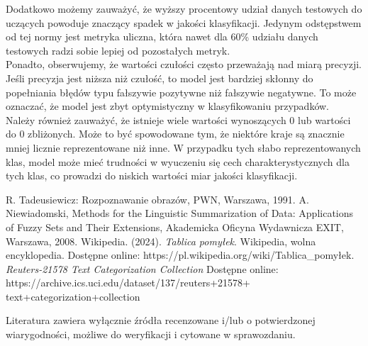 \documentclass{article}
\begin{document}
\noindent Dodatkowo możemy zauważyć, że wyższy procentowy udział danych testowych do uczących powoduje znaczący spadek w jakości klasyfikacji. Jedynym odstępstwem od tej normy jest metryka uliczna, która nawet dla 60\% udziału danych testowych radzi sobie lepiej od pozostałych metryk. \\

\noindent Ponadto, obserwujemy, że wartości czułości często przeważają nad miarą precyzji. Jeśli precyzja jest niższa niż czułość, to model jest bardziej skłonny do popełniania błędów typu fałszywie pozytywne niż fałszywie negatywne. To może oznaczać, że model jest zbyt optymistyczny w klasyfikowaniu przypadków. \\

\noindent Należy również zauważyć, że istnieje wiele wartości wynoszących 0 lub wartości do 0 zbliżonych. Może to być spowodowane tym, że niektóre kraje są znacznie mniej licznie reprezentowane niż inne. W przypadku tych słabo reprezentowanych klas, model może mieć trudności w wyuczeniu się cech charakterystycznych dla tych klas, co prowadzi do niskich wartości miar jakości klasyfikacji. \\


\newpage

\begin{thebibliography}{0}
 R. Tadeusiewicz: Rozpoznawanie obrazów, PWN, Warszawa, 1991.  
 A. Niewiadomski, Methods for the Linguistic Summarization of Data: Applications of Fuzzy Sets and Their Extensions, Akademicka Oficyna Wydawnicza EXIT, Warszawa, 2008.
 Wikipedia. (2024). \emph{Tablica pomyłek}. Wikipedia, wolna encyklopedia. Dostępne online: https://pl.wikipedia.org/wiki/Tablica\_pomyłek.
 \emph{Reuters-21578 Text Categorization Collection} Dostępne online: https://archive.ics.uci.edu/dataset/137/reuters+21578+\\text+categorization+collection
\end{thebibliography}

Literatura zawiera wyłącznie źródła recenzowane i/lub o potwierdzonej wiarygodności,
możliwe do weryfikacji i cytowane w sprawozdaniu. 
\end{document}
